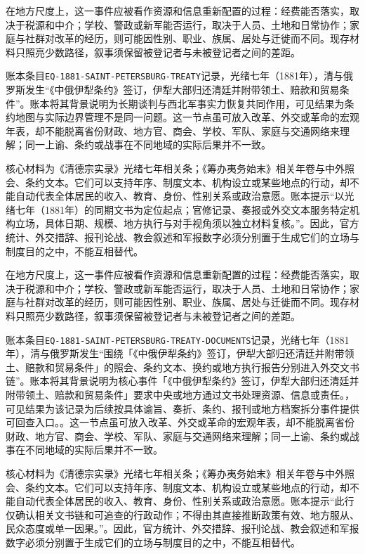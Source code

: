 在地方尺度上，这一事件应被看作资源和信息重新配置的过程：经费能否落实，取决于税源和中介；学校、警政或新军能否运行，取决于人员、土地和日常协作；家庭与社群对改革的经历，则可能因性别、职业、族属、居处与迁徙而不同。现存材料只照亮少数路径，叙事须保留被登记者与未被登记者之间的差距。

账本条目\texttt{EQ-1881-SAINT-PETERSBURG-TREATY}记录，光绪七年（1881年），清与俄罗斯发生“《中俄伊犁条约》签订，伊犁大部归还清廷并附带领土、赔款和贸易条件”。账本将其背景说明为长期谈判与西北军事实力恢复共同作用，可见结果为条约地图与实际边界管理不是同一问题。这一节点虽可放入改革、外交或革命的宏观年表，却不能脱离省份财政、地方官、商会、学校、军队、家庭与交通网络来理解；同一上谕、条约或战事在不同地域的实际后果并不一致。

核心材料为《清德宗实录》光绪七年相关条；《筹办夷务始末》相关年卷与中外照会、条约文本。它们可以支持年序、制度文本、机构设立或某些地点的行动，却不能自动代表全体居民的收入、教育、身份、性别关系或政治意愿。账本提示“以光绪七年（1881年）的同期文书为定位起点；官修记录、奏报或外交文本服务特定机构立场，具体日期、规模、地方执行与对手视角须以独立材料复核。”。因此，官方统计、外交措辞、报刊论战、教会叙述和军报数字必须分别置于生成它们的立场与制度目的之中，不能互相替代。

在地方尺度上，这一事件应被看作资源和信息重新配置的过程：经费能否落实，取决于税源和中介；学校、警政或新军能否运行，取决于人员、土地和日常协作；家庭与社群对改革的经历，则可能因性别、职业、族属、居处与迁徙而不同。现存材料只照亮少数路径，叙事须保留被登记者与未被登记者之间的差距。

账本条目\texttt{EQ-1881-SAINT-PETERSBURG-TREATY-DOCUMENTS}记录，光绪七年（1881年），清与俄罗斯发生“围绕「《中俄伊犁条约》签订，伊犁大部归还清廷并附带领土、赔款和贸易条件」的照会、条约文本、换约或地方执行报告分别进入外交文书链”。账本将其背景说明为核心事件「《中俄伊犁条约》签订，伊犁大部归还清廷并附带领土、赔款和贸易条件」要求中央或地方通过文书处理资源、信息或责任。，可见结果为该记录为后续按具体谕旨、奏折、条约、报刊或地方档案拆分事件提供可回查入口。。这一节点虽可放入改革、外交或革命的宏观年表，却不能脱离省份财政、地方官、商会、学校、军队、家庭与交通网络来理解；同一上谕、条约或战事在不同地域的实际后果并不一致。

核心材料为《清德宗实录》光绪七年相关条；《筹办夷务始末》相关年卷与中外照会、条约文本。它们可以支持年序、制度文本、机构设立或某些地点的行动，却不能自动代表全体居民的收入、教育、身份、性别关系或政治意愿。账本提示“此行仅确认相关文书链和可追查的行政动作；不得由其直接推断政策有效、地方服从、民众态度或单一因果。”。因此，官方统计、外交措辞、报刊论战、教会叙述和军报数字必须分别置于生成它们的立场与制度目的之中，不能互相替代。

